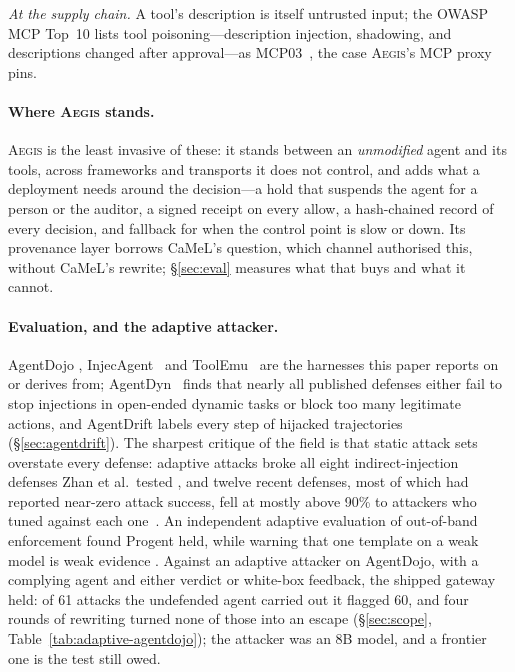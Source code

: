 \documentclass[sigconf,nonacm]{acmart}
\newcommand{\system}{\textsc{Aegis}\xspace}
\begin{document}
\emph{At the supply chain.} A tool's description is itself untrusted
input; the OWASP MCP Top~10 lists tool poisoning---description
injection, shadowing, and descriptions changed after approval---as
MCP03~\cite{owaspmcp2025}, the case \system's MCP proxy pins.

\paragraph{Where \system{} stands.} \system{} is the least invasive of
these: it stands between an \emph{unmodified} agent and its tools, across
frameworks and transports it does not control, and adds what a
deployment needs around the decision---a hold that suspends the agent for a person or the auditor, a signed receipt on every allow, a hash-chained record of every decision, and fallback for when the control point is slow or down. Its provenance layer borrows CaMeL's question,
which channel authorised this, without CaMeL's rewrite;
\S\ref{sec:eval} measures what that buys and what it cannot.

\paragraph{Evaluation, and the adaptive attacker.} AgentDojo
\cite{debenedetti2024agentsec}, InjecAgent~\cite{zhan2024injecagent} and
ToolEmu~\cite{ruan2024toolemu} are the harnesses this paper reports on or
derives from; AgentDyn~\cite{li2026agentdyn} finds that nearly all
published defenses either fail to stop injections in open-ended dynamic
tasks or block too many legitimate actions, and AgentDrift
\cite{pinjari2026agentdrift} labels every step of hijacked trajectories
(\S\ref{sec:agentdrift}). The sharpest critique of the field is that
static attack sets overstate every defense: adaptive attacks broke all
eight indirect-injection defenses Zhan et al.\ tested
\cite{zhan2025adaptive}, and twelve recent defenses, most of which had
reported near-zero attack success, fell at mostly above 90\%
to attackers who tuned against each one~\cite{nasr2025attacker}. An
independent adaptive evaluation of out-of-band enforcement found Progent
held, while warning that one template on a weak model is weak evidence
\cite{narisetty2026adaptive}. Against an adaptive attacker on AgentDojo, with a complying agent and either verdict or white-box feedback, the shipped gateway held: of 61 attacks the undefended agent carried out it flagged 60, and four rounds of rewriting turned none of those into an escape (\S\ref{sec:scope}, Table~\ref{tab:adaptive-agentdojo}); the attacker was an 8B model, and a frontier one is the test still owed.
\end{document}
